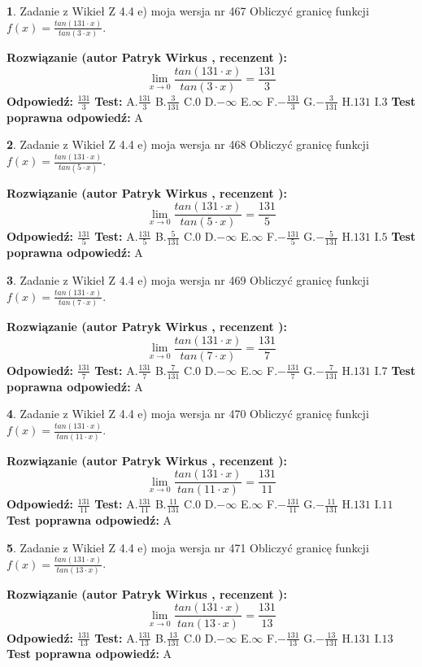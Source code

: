 \documentclass[12pt, a4paper]{article}
\theoremstyle{definition} %
\newtheorem{zad}{}
\newcommand{\zadStart}[1]{\begin{zad}#1\newline}
\newcommand{\zadStop}{\end{zad}}
\newcommand{\rozwStart}[2]{\noindent \textbf{Rozwiązanie (autor #1 , recenzent #2): }\newline}
\newcommand{\rozwStop}{\newline}
\newcommand{\odpStart}{\noindent \textbf{Odpowiedź:}\newline}
\newcommand{\odpStop}{\newline}
\newcommand{\testStart}{\noindent \textbf{Test:}\newline}
\newcommand{\testStop}{\newline}
\newcommand{\kluczStart}{\noindent \textbf{Test poprawna odpowiedź:}\newline}
\newcommand{\kluczStop}{\newline}
\begin{document}
\zadStart{Zadanie z Wikieł Z 4.4 e) moja wersja nr 467}
Obliczyć granicę funkcji $f(x)=\frac{tan(131\cdot x)}{tan(3\cdot x)}$.
\zadStop
\rozwStart{Patryk Wirkus}{}
$$\lim\limits_{x\to 0}\frac{tan(131\cdot x)}{tan(3\cdot x)}=
\frac{131}{3}$$
\rozwStop
\odpStart
$\frac{131}{3}$
\odpStop
\testStart
A.$\frac{131}{3}$
B.$\frac{3}{131}$
C.$0$
D.$-\infty$
E.$\infty$
F.$-\frac{131}{3}$
G.$-\frac{3}{131}$
H.$131$
I.$3$
\testStop
\kluczStart
A
\kluczStop



\zadStart{Zadanie z Wikieł Z 4.4 e) moja wersja nr 468}
Obliczyć granicę funkcji $f(x)=\frac{tan(131\cdot x)}{tan(5\cdot x)}$.
\zadStop
\rozwStart{Patryk Wirkus}{}
$$\lim\limits_{x\to 0}\frac{tan(131\cdot x)}{tan(5\cdot x)}=
\frac{131}{5}$$
\rozwStop
\odpStart
$\frac{131}{5}$
\odpStop
\testStart
A.$\frac{131}{5}$
B.$\frac{5}{131}$
C.$0$
D.$-\infty$
E.$\infty$
F.$-\frac{131}{5}$
G.$-\frac{5}{131}$
H.$131$
I.$5$
\testStop
\kluczStart
A
\kluczStop



\zadStart{Zadanie z Wikieł Z 4.4 e) moja wersja nr 469}
Obliczyć granicę funkcji $f(x)=\frac{tan(131\cdot x)}{tan(7\cdot x)}$.
\zadStop
\rozwStart{Patryk Wirkus}{}
$$\lim\limits_{x\to 0}\frac{tan(131\cdot x)}{tan(7\cdot x)}=
\frac{131}{7}$$
\rozwStop
\odpStart
$\frac{131}{7}$
\odpStop
\testStart
A.$\frac{131}{7}$
B.$\frac{7}{131}$
C.$0$
D.$-\infty$
E.$\infty$
F.$-\frac{131}{7}$
G.$-\frac{7}{131}$
H.$131$
I.$7$
\testStop
\kluczStart
A
\kluczStop



\zadStart{Zadanie z Wikieł Z 4.4 e) moja wersja nr 470}
Obliczyć granicę funkcji $f(x)=\frac{tan(131\cdot x)}{tan(11\cdot x)}$.
\zadStop
\rozwStart{Patryk Wirkus}{}
$$\lim\limits_{x\to 0}\frac{tan(131\cdot x)}{tan(11\cdot x)}=
\frac{131}{11}$$
\rozwStop
\odpStart
$\frac{131}{11}$
\odpStop
\testStart
A.$\frac{131}{11}$
B.$\frac{11}{131}$
C.$0$
D.$-\infty$
E.$\infty$
F.$-\frac{131}{11}$
G.$-\frac{11}{131}$
H.$131$
I.$11$
\testStop
\kluczStart
A
\kluczStop



\zadStart{Zadanie z Wikieł Z 4.4 e) moja wersja nr 471}
Obliczyć granicę funkcji $f(x)=\frac{tan(131\cdot x)}{tan(13\cdot x)}$.
\zadStop
\rozwStart{Patryk Wirkus}{}
$$\lim\limits_{x\to 0}\frac{tan(131\cdot x)}{tan(13\cdot x)}=
\frac{131}{13}$$
\rozwStop
\odpStart
$\frac{131}{13}$
\odpStop
\testStart
A.$\frac{131}{13}$
B.$\frac{13}{131}$
C.$0$
D.$-\infty$
E.$\infty$
F.$-\frac{131}{13}$
G.$-\frac{13}{131}$
H.$131$
I.$13$
\testStop
\kluczStart
A
\kluczStop
\end{document}
